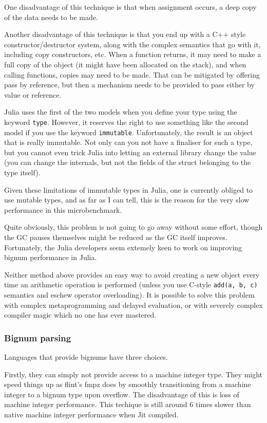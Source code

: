 \documentclass[a4paper,10pt]{article}
\newcommand{\code}{\lstinline}
\begin{document}
One disadvantage of this technique is that when assignment occurs, a deep copy of the data needs to
be made.

Another disadvantage of this technique is that you end up with a C++ style constructor/destructor
system, along with the complex semantics that go with it, including copy constructors, etc. When
a function returns, it may need to make a full copy of the object (it might have been allocated
on the stack), and when calling functions, copies may need to be made. That can be mitigated by
offering pass by reference, but then a mechanism needs to be provided to pass either by value or
reference.

Julia uses the first of the two models when you define your type using the keyword \code{type}. 
However, it reserves the right to use something like the second model if you use the keyword
\code{immutable}. Unfortunately, the result is an object that is really immutable. Not only can
you not have a finaliser for such a type, but you cannot even trick Julia into letting an external
library change the value (you can change the internals, but not the fields of the struct belonging 
to the type itself). 

Given these limitations of immutable types in Julia, one is currently obliged to use mutable types,
and as far as I can tell, this is the reason for the very slow performance in this microbenchmark.

Quite obviously, this problem is not going to go away without some effort, though the GC pauses 
themselves might be reduced as the GC itself improves. Fortunately, the Julia developers seem
extemely keen to work on improving bignum performance in Julia.

Neither method above provides an easy way to avoid creating a new object every time an arithmetic 
operation is performed (unless you use C-style \code{add(a, b, c)} semantics and eschew operator
overloading). It is possible to solve this problem with complex metaprogramming and delayed
evaluation, or with severely complex compiler magic which no one has ever mastered.

\subsubsection{Bignum parsing}

Languages that provide bignums have three choices.

Firstly, they can simply not provide access to a machine integer type. They might speed things up
as flint's fmpz does by smoothly transitioning from a machine integer to a bignum type upon
overflow. The disadvantage of this is loss of machine integer performance. This techique is still
around 6 times slower than native machine integer performance when Jit compiled.
\end{document}
